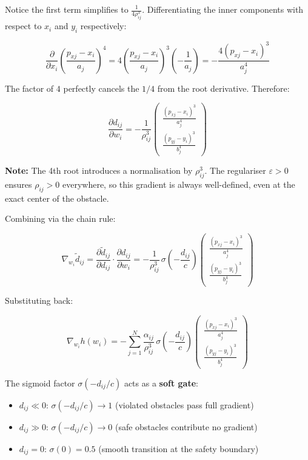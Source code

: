 \documentclass{article}
\newcommand{\sigmoid}{\sigma}
\begin{document}
Notice the first term simplifies to $\frac{1}{4\rho_{ij}^3}$. Differentiating the inner components with respect to $x_i$ and $y_i$ respectively:

\begin{equation}
    \frac{\partial}{\partial x_i} \left(\frac{p_{xj} - x_i}{a_j}\right)^4
    = 4 \left(\frac{p_{xj} - x_i}{a_j}\right)^3 \left(-\frac{1}{a_j}\right)
    = -\frac{4(p_{xj} - x_i)^3}{a_j^4}
\end{equation}

The factor of $4$ perfectly cancels the $1/4$ from the root derivative. Therefore:

\begin{equation}
    \frac{\partial d_{ij}}{\partial w_i}
    = -\frac{1}{\rho_{ij}^3} \begin{pmatrix} \frac{(p_{xj} - x_i)^3}{a_j^4} \\ \frac{(p_{yj} - y_i)^3}{b_j^4} \end{pmatrix}
\end{equation}

\textbf{Note:} The 4th root introduces a normalisation by $\rho_{ij}^3$. The regulariser $\varepsilon > 0$ ensures $\rho_{ij} > 0$ everywhere, so this gradient is always well-defined, even at the exact center of the obstacle.

Combining via the chain rule:

\begin{equation}
    \nabla_{w_i} \tilde{d}_{ij}
    = \frac{\partial \tilde{d}_{ij}}{\partial d_{ij}} \cdot \frac{\partial d_{ij}}{\partial w_i}
    = -\frac{1}{\rho_{ij}^3}\,\sigmoid\!\left(-\frac{d_{ij}}{c}\right) \begin{pmatrix} \frac{(p_{xj} - x_i)^3}{a_j^4} \\ \frac{(p_{yj} - y_i)^3}{b_j^4} \end{pmatrix}
\end{equation}

Substituting back:

\begin{equation}
\boxed{
    \nabla_{w_i} h(w_i)
    = -\sum_{j=1}^{N} \frac{\alpha_{ij}}{\rho_{ij}^3}\,
      \sigmoid\!\left(-\frac{d_{ij}}{c}\right) \begin{pmatrix} \frac{(p_{xj} - x_i)^3}{a_j^4} \\ \frac{(p_{yj} - y_i)^3}{b_j^4} \end{pmatrix}
}
\end{equation}

The sigmoid factor $\sigmoid(-d_{ij}/c)$ acts as a \textbf{soft gate}:
\begin{itemize}
    \item $d_{ij} \ll 0$: $\sigmoid(-d_{ij}/c) \to 1$
          \quad (violated obstacles pass full gradient)
    \item $d_{ij} \gg 0$: $\sigmoid(-d_{ij}/c) \to 0$
          \quad (safe obstacles contribute no gradient)
    \item $d_{ij} = 0$:  $\sigmoid(0) = 0.5$
          \quad (smooth transition at the safety boundary)
\end{itemize}
\end{document}
